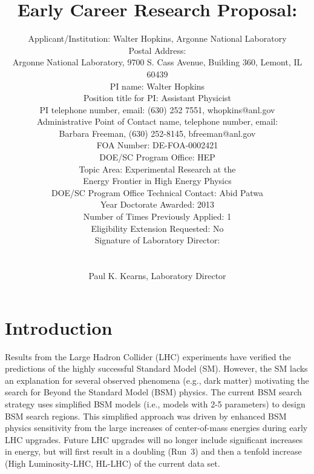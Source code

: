 \documentclass[letter, USenglish, 11pt, subfigure]{article}
\title{Early Career Research Proposal: \\}
\author{Applicant/Institution: Walter Hopkins, Argonne National Laboratory\\ Postal Address: \\Argonne National Laboratory, 9700 S. Cass Avenue, Building 360, Lemont, IL 60439
  \\PI name: Walter Hopkins\\Position title for PI: Assistant Physicist\\PI telephone number, email: (630) 252 7551, whopkins@anl.gov\\Administrative Point of Contact name, telephone number, email:\\Barbara Freeman, (630) 252-8145, bfreeman@anl.gov\\FOA Number: DE-FOA-0002421\\DOE/SC Program Office: HEP\\ Topic Area: Experimental Research at the \\Energy Frontier in High Energy Physics\\DOE/SC Program Office Technical Contact: Abid Patwa\\Year Doctorate Awarded: 2013\\Number of Times Previously Applied: 1\\Eligibility Extension Requested: No\\Signature of Laboratory Director: \\ \\ \\Paul K. Kearns, Laboratory Director
}
\date{}
\begin{document}
%

\clearpage
\tableofcontents
\clearpage
{} 




\section{Introduction}

Results from the Large Hadron Collider (LHC) experiments have verified the predictions of the highly successful Standard Model (SM). However, the SM  lacks an explanation for several observed phenomena (e.g., dark matter) motivating the search for Beyond the Standard Model (BSM) physics. The current BSM search strategy uses simplified BSM models (i.e., models with 2-5 parameters) to design BSM search regions. This simplified approach was driven by enhanced BSM physics sensitivity from the large increases of center-of-mass energies during early LHC upgrades. Future LHC upgrades will no longer include significant increases in energy, but will first result in a doubling (Run~3) and then a tenfold increase (High Luminosity-LHC, HL-LHC) of the current data set.
\end{document}

